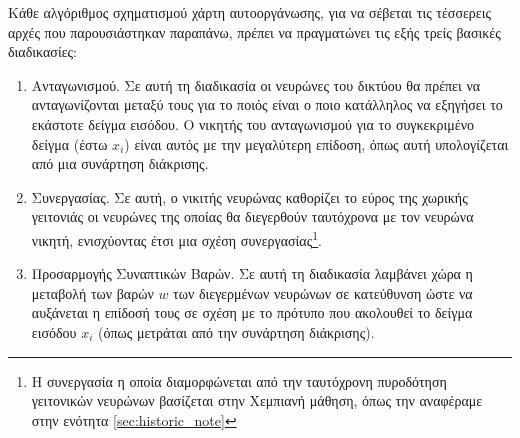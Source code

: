 Κάθε αλγόριθμος σχηματισμού χάρτη αυτο\textendash οργάνωσης, για να σέβεται τις τέσσερεις αρχές που παρουσιάστηκαν παραπάνω, πρέπει να πραγματώνει τις εξής τρείς βασικές διαδικασίες:
\begin{enumerate}
  \item Ανταγωνισμού. Σε αυτή τη διαδικασία οι νευρώνες του δικτύου θα πρέπει να ανταγωνίζονται μεταξύ τους για το ποιός είναι ο ποιο κατάλληλος να εξηγήσει το εκάστοτε δείγμα εισόδου. Ο νικητής του ανταγωνισμού για το συγκεκριμένο δείγμα (έστω $x_i$) είναι αυτός με την μεγαλύτερη επίδοση, όπως αυτή υπολογίζεται από μια συνάρτηση διάκρισης.
  \item Συνεργασίας. Σε αυτή, ο νικιτής νευρώνας καθορίζει το εύρος της χωρικής γειτονιάς οι νευρώνες της οποίας θα διεγερθούν ταυτόχρονα με τον νευρώνα νικητή, ενισχύοντας έτσι μια σχέση συνεργασίας\footnote{Η συνεργασία η οποία διαμορφώνεται από την ταυτόχρονη πυροδότηση γειτονικών νευρώνων βασίζεται στην Χεμπιανή μάθηση, όπως την αναφέραμε στην ενότητα \ref{sec:historic_note}}.
  \item  Προσαρμογής Συναπτικών Βαρών. Σε αυτή τη διαδικασία λαμβάνει χώρα η μεταβολή των βαρών $w$ των διεγερμένων νευρώνων σε κατεύθυνση ώστε να αυξάνεται η επίδοσή τους σε σχέση με το πρότυπο που ακολουθεί το δείγμα εισόδου $x_i$ (όπως μετράται από την συνάρτηση διάκρισης).\cite{haykin2009neural}
\end{enumerate}

